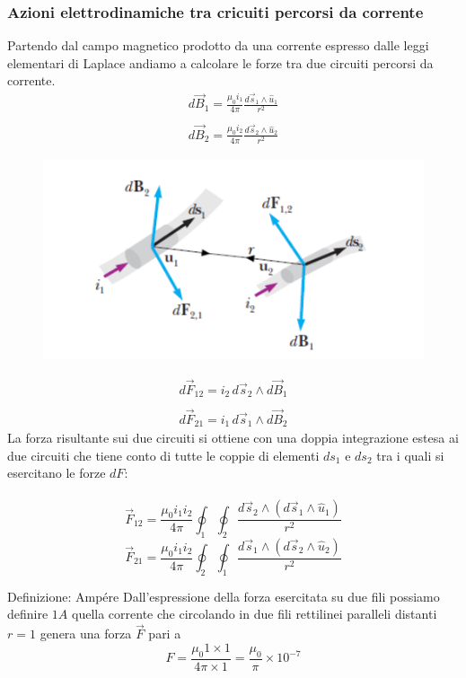 \documentclass[x11names]{report}
\newcommand{\definizione}[2]{
	\begin{center}
		\fboxsep11pt
		\colorbox{myblue}{\begin{minipage}{5.75in}
				\begin{blues}{Definizione: #1}
					#2
				\end{blues}
		\end{minipage}}
	\end{center}
}
\begin{document}
\subsubsection{Azioni elettrodinamiche tra cricuiti percorsi da corrente}
Partendo dal campo magnetico prodotto da una corrente espresso dalle leggi elementari di Laplace andiamo a calcolare le forze tra due circuiti percorsi da corrente.
\begin{gather*}
	d\vec{B}_1 = \frac{\mu_0 i_1}{4\pi}\frac{d\vec{s}_1\wedge\hat{u}_1}{r^2} \\ \\
	d\vec{B}_2 = \frac{\mu_0 i_2}{4\pi}\frac{d\vec{s}_2\wedge\hat{u}_2}{r^2}
\end{gather*}
\begin{figure}
	\includegraphics[scale=0.5]{img/az_el.png}
\end{figure}
\begin{gather*}
	d\vec{F}_{12} = i_2 \, d\vec{s}_2 \wedge d\vec{B}_1 \\ \\
	d\vec{F}_{21} = i_1 \, d\vec{s}_1 \wedge d\vec{B}_2
\end{gather*}  
La forza risultante sui due circuiti si ottiene con una doppia integrazione estesa ai due circuiti che tiene conto di tutte le coppie di elementi \(ds_1\) e \(ds_2\) tra i quali si esercitano le forze \(dF\): \\ \\
\[
\vec{F}_{12} = \frac{\mu_0i_1i_2}{4\pi}\oint_1\oint_2\frac{d\vec{s}_2 \wedge (d\vec{s}_1\wedge\hat{u}_1)}{r^2}
\]
\[
\vec{F}_{21} = \frac{\mu_0i_1i_2}{4\pi}\oint_2\oint_1\frac{d\vec{s}_1 \wedge (d\vec{s}_2\wedge\hat{u}_2)}{r^2}
\]
\definizione{Ampére}{Dall'espressione della forza esercitata su due fili possiamo definire \(1A\) quella corrente che circolando in due fili rettilinei paralleli distanti \(r=1\) genera una forza \(\vec{F}\) pari a 
\[
F = \frac{\mu_0 1\times 1}{4\pi\times 1} =\frac{\mu_0}{\pi}\times 10^{-7}
\]}
\end{document}
